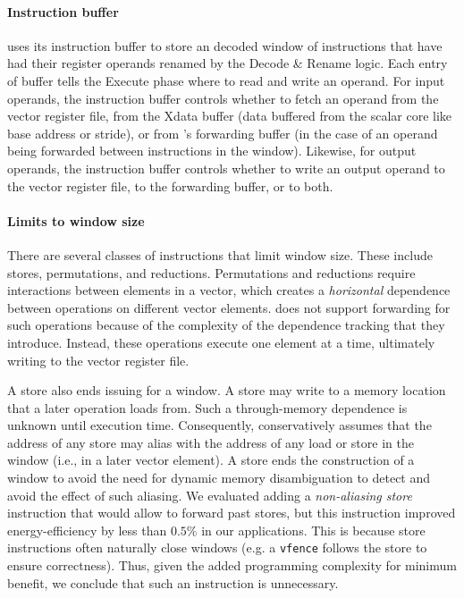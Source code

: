 \paragraph{Instruction buffer}
\manic uses its instruction buffer to store an decoded window of
instructions that have had their register operands renamed by the Decode \& Rename logic.
% 
Each entry of buffer tells the Execute phase where to read and write an operand.
% 
For input operands, the instruction buffer controls whether to fetch an operand from the
vector register file, from the Xdata buffer (data buffered from the scalar core like base address or stride), or from \manic's forwarding buffer (in the case of an
operand being forwarded between instructions in the window).
%
Likewise, for output operands, the instruction buffer controls whether to write
an output operand to the vector register file, to the forwarding buffer, or to both.

\paragraph{Limits to window size}
There are several classes of instructions that limit window size.
%
These include stores, permutations, and reductions.
%
Permutations and reductions require interactions between elements in a vector, which
creates a {\em horizontal} dependence between operations on different vector elements.
%
\manic does not support forwarding for such operations because of the complexity of
the dependence tracking that they introduce.  
% 
Instead, these operations execute one element at a time, ultimately writing to the vector register file. 

A store also ends issuing for a window.  A store may write to a memory
location that a later operation loads from. Such a through-memory dependence is 
unknown until execution time.  Consequently, \manic conservatively assumes
that the address of any store may alias with the address of any load or store in the window (i.e., in a later vector element).
A store ends the construction of a window to avoid the need for dynamic memory disambiguation to
detect and avoid the effect of such aliasing.
% 
We evaluated adding a \emph{non-aliasing store} instruction that would allow \manic to forward past stores,
but this instruction improved energy-efficiency by less than $0.5\%$ in our applications.
% 
This is because store instructions often naturally close windows (e.g. a {\tt vfence} follows the store to ensure correctness).
% 
Thus, given the added programming complexity for minimum benefit, we conclude that such an instruction is unnecessary.
%

